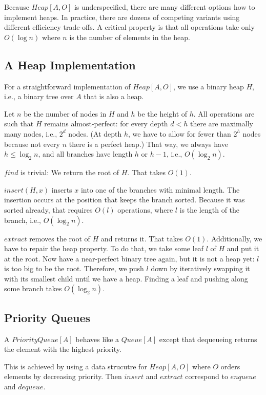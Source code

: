 Because $Heap[A,O]$ is underspecified, there are many different options how to implement heaps.
In practice, there are dozens of competing variants using different efficiency trade-offs.
A critical property is that all operations take only $O(\log n)$ where $n$ is the number of elements in the heap.

\subsection{A Heap Implementation}

For a straightforward implementation of $Heap[A,O]$, we use a binary heap $H$, i.e., a binary tree over $A$ that is also a heap.

Let $n$ be the number of nodes in $H$ and $h$ be the height of $h$.
All operations are such that $H$ remains almost-perfect: for every depth $d<h$ there are maximally many nodes, i.e., $2^d$ nodes.
(At depth $h$, we have to allow for fewer than $2^h$ nodes because not every $n$ there is a perfect heap.)
That way, we always have $h\leq\log_2 n$, and all branches have length $h$ or $h-1$, i.e., $O(\log_2 n)$.

$find$ is trivial: We return the root of $H$. That takes $O(1)$.

$insert(H,x)$ inserts $x$ into one of the branches with minimal length.
The insertion occurs at the position that keeps the branch sorted.
Because it was sorted already, that requires $O(l)$ operations, where $l$ is the length of the branch, i.e., $O(\log_2 n)$.

$extract$ removes the root of $H$ and returns it.
That takes $O(1)$.
Additionally, we have to repair the heap property.
To do that, we take some leaf $l$ of $H$ and put it at the root.
Now have a near-perfect binary tree again, but it is not a heap yet: $l$ is too big to be the root.
Therefore, we push $l$ down by iteratively swapping it with its smallest child until we have a heap.
Finding a leaf and pushing along some branch takes $O(\log_2 n)$.

\subsection{Priority Queues}\label{sec:ad:heapqueue}

A $PriorityQueue[A]$ behaves like a $Queue[A]$ except that dequeueing returns the element with the highest priority.

This is achieved by using a data strucutre for $Heap[A,O]$ where $O$ orders elements by decreasing priority.
Then $insert$ and $extract$ correspond to $enqueue$ and $dequeue$.

